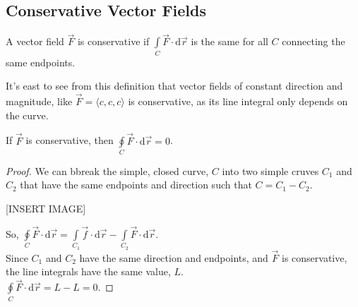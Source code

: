 \subsection{Conservative Vector Fields}
\begin{definition}
	A vector field $\vec{F}$ is conservative if $\int\limits_{C}{\vec{F}\cdot\mathrm{d}\vec{r}}$ is the same for all $C$ connecting the same endpoints.
\end{definition}

\noindent
It's east to see from this definition that vector fields of constant direction and magnitude, like $\vec{F}=\langle c,c,c\rangle$ is conservative, as its line integral only depends on the curve.\\

\begin{theorem}
	If $\vec{F}$ is conservative, then $\oint\limits_{C}{\vec{F}\cdot\mathrm{d}\vec{r}}=0$.
\end{theorem}
\begin{proof}
	We can bbreak the simple, closed curve, $C$ into two simple cruves $C_1$ and $C_2$ that have the same endpoints and direction such that $C=C_1-C_2$.
	
	[INSERT IMAGE]
	
	\noindent
	So, $\oint\limits_{C}{\vec{F}\cdot\mathrm{d}\vec{r}}=\int\limits_{C_1}{\vec{f}\cdot\mathrm{d}\vec{r}}-\int\limits_{C_2}{\vec{F}\cdot\mathrm{d}\vec{r}}$.\\
	Since $C_1$ and $C_2$ have the same direction and endpoints, and $\vec{F}$ is conservative, the line integrals have the same value, $L$.\\
	$\oint\limits_{C}{\vec{F}\cdot\mathrm{d}\vec{r}}=L-L=0$.
\end{proof}